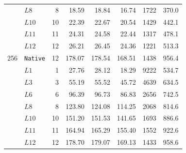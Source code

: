 \begin{table}[t]
\begin{tabular}{llrrrrrr}
         & \(L8\) & 8 & 18.59 & 18.84 & 16.74 & 1722 & 370.0 \\
         & \(L10\) & 10 & 22.39 & 22.67 & 20.54 & 1429 & 442.1 \\
         & \(L11\) & 11 & 24.31 & 24.58 & 22.44 & 1317 & 478.1 \\
         & \(L12\) & 12 & 26.21 & 26.45 & 24.36 & 1221 & 513.3 \\
        \midrule
        256 & \texttt{Native} & 12 & 178.07 & 178.54 & 168.51 & 1438 & 956.4 \\
         & \(L1\) & 1 & 27.76 & 28.12 & 18.29 & 9222 & 534.7 \\
         & \(L3\) & 3 & 55.19 & 55.52 & 45.72 & 4639 & 634.5 \\
         & \(L6\) & 6 & 96.39 & 96.73 & 86.83 & 2656 & 742.5 \\
         & \(L8\) & 8 & 123.80 & 124.08 & 114.25 & 2068 & 814.6 \\
         & \(L10\) & 10 & 151.20 & 151.53 & 141.65 & 1693 & 886.6 \\
         & \(L11\) & 11 & 164.94 & 165.29 & 155.40 & 1552 & 922.6 \\
         & \(L12\) & 12 & 178.70 & 179.07 & 169.13 & 1433 & 958.6 \\
        \bottomrule
    \end{tabular}
\end{table}
